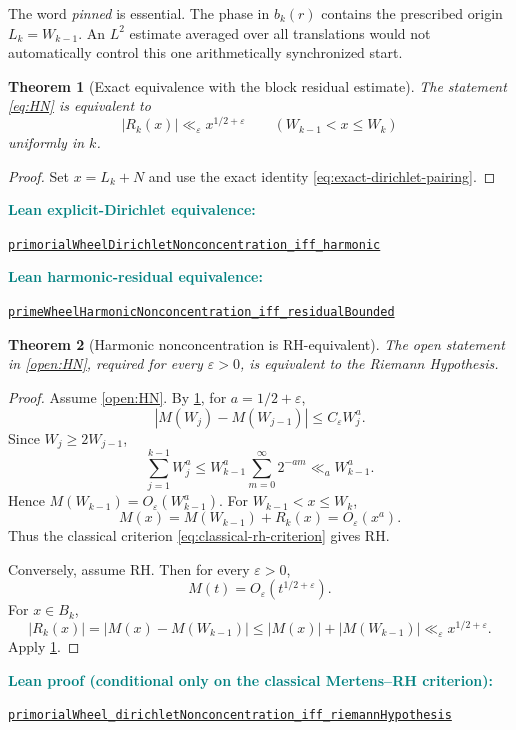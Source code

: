 \documentclass[11pt]{article}
\newtheorem{theorem}{Theorem}[section]
\theoremstyle{definition}
\newcommand{\leanxref}[3]{%
  \par\smallskip
  {\small\noindent\textcolor{teal}{\textbf{#1:}}\par
  \noindent\href{#3}{\nolinkurl{#2}}\par}
  \smallskip
}
\begin{document}
The word \emph{pinned} is essential.  The phase in $b_k(r)$ contains the prescribed origin $L_k=W_{k-1}$.  An $L^2$ estimate averaged over all translations would not automatically control this one arithmetically synchronized start.

\begin{theorem}[Exact equivalence with the block residual estimate]\label{thm:HN-equivalent-residual}
The statement \eqref{eq:HN} is equivalent to
\[
|R_k(x)|\ll_{\varepsilon}x^{1/2+\varepsilon}
\qquad(W_{k-1}<x\le W_k)
\]
uniformly in $k$.
\end{theorem}

\begin{proof}
Set $x=L_k+N$ and use the exact identity \eqref{eq:exact-dirichlet-pairing}.
\end{proof}
\leanxref{Lean explicit-Dirichlet equivalence}{primorialWheelDirichletNonconcentration_iff_harmonic}{https://github.com/OVVO-Financial/prime-wheel-mobius/blob/main/formalization/RHLean/Analysis/PrimeWheelExplicitCriterion.lean}
\leanxref{Lean harmonic-residual equivalence}{primeWheelHarmonicNonconcentration_iff_residualBounded}{https://github.com/OVVO-Financial/prime-wheel-mobius/blob/main/formalization/RHLean/Analysis/PrimeWheelHarmonicCriterion.lean}

\begin{theorem}[Harmonic nonconcentration is RH-equivalent]\label{thm:HN-RH}
The open statement in \cref{open:HN}, required for every $\varepsilon>0$, is equivalent to the Riemann Hypothesis.
\end{theorem}

\begin{proof}
Assume \cref{open:HN}.  By \cref{thm:HN-equivalent-residual}, for $a=1/2+\varepsilon$,
\[
|M(W_j)-M(W_{j-1})|\le C_{\varepsilon}W_j^a.
\]
Since $W_j\ge2W_{j-1}$,
\[
\sum_{j=1}^{k-1}W_j^a
\le W_{k-1}^a\sum_{m=0}^{\infty}2^{-am}
\ll_a W_{k-1}^a.
\]
Hence $M(W_{k-1})=O_{\varepsilon}(W_{k-1}^a)$.  For $W_{k-1}<x\le W_k$,
\[
M(x)=M(W_{k-1})+R_k(x)
=O_{\varepsilon}(x^a).
\]
Thus the classical criterion \eqref{eq:classical-rh-criterion} gives RH.

Conversely, assume RH.  Then for every $\varepsilon>0$,
\[
M(t)=O_{\varepsilon}(t^{1/2+\varepsilon}).
\]
For $x\in B_k$,
\[
|R_k(x)|=|M(x)-M(W_{k-1})|
\le |M(x)|+|M(W_{k-1})|
\ll_{\varepsilon}x^{1/2+\varepsilon}.
\]
Apply \cref{thm:HN-equivalent-residual}.
\end{proof}
\leanxref{Lean proof (conditional only on the classical Mertens--RH criterion)}{primorialWheel_dirichletNonconcentration_iff_riemannHypothesis}{https://github.com/OVVO-Financial/prime-wheel-mobius/blob/main/formalization/RHLean/Analysis/PublicPrimeWheelReduction.lean}
\end{document}
